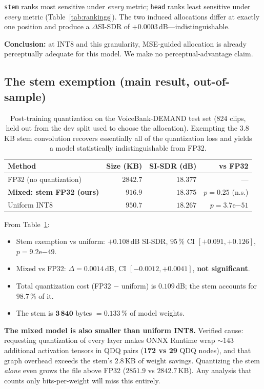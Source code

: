 \documentclass[conference]{IEEEtran}
\begin{document}
\texttt{stem} ranks most sensitive under \emph{every} metric; \texttt{head} ranks least sensitive
under \emph{every} metric (Table~\ref{tab:rankings}). The two induced allocations differ at exactly
one position and produce a $\Delta$SI-SDR of $+0.0003$\,dB---indistinguishable.

\textbf{Conclusion:} at INT8 and this granularity, MSE-guided allocation is already perceptually
adequate for this model. We make no perceptual-advantage claim.

\subsection{The stem exemption (main result, out-of-sample)}
\label{sec:stem}

\begin{table}[t]
\centering
\caption{Post-training quantization on the VoiceBank-DEMAND test set (824 clips, held out from the
dev split used to choose the allocation). Exempting the 3.8\,KB stem convolution recovers
essentially all of the quantization loss and yields a model statistically indistinguishable from
FP32.}
\label{tab:main}
\begin{tabular}{lrrr}
\toprule
Method & Size (KB) & SI-SDR (dB) & vs FP32 \\
\midrule
FP32 (no quantization) & $2842.7$ & $18.377$ & --- \\
\textbf{Mixed: stem FP32 (ours)} & $\mathbf{916.9}$ & $\mathbf{18.375}$ & $p = 0.25$ (n.s.) \\
Uniform INT8 & $950.7$ & $18.267$ & $p = 3.7\mathrm{e}{-51}$ \\
\bottomrule
\end{tabular}
\end{table}

From Table~\ref{tab:main}:
\begin{itemize}
\item Stem exemption vs uniform: $+0.108$\,dB SI-SDR, $95\,\%$ CI $[+0.091, +0.126]$,
$p = 9.2\mathrm{e}{-49}$.
\item Mixed vs FP32: $\Delta = 0.0014$\,dB, CI $[-0.0012, +0.0041]$, \textbf{not significant}.
\item Total quantization cost (FP32 $-$ uniform) is $0.109$\,dB; the stem accounts for
$\mathbf{98.7\,\%}$ of it.
\item The stem is $\mathbf{3\,840}$ bytes $= 0.133\,\%$ of model weights.
\end{itemize}

\textbf{The mixed model is also smaller than uniform INT8.} Verified cause: requesting quantization
of every layer makes ONNX Runtime wrap ${\sim}143$ additional activation tensors in QDQ pairs
(\textbf{172 vs 29} QDQ nodes), and that graph overhead exceeds the stem's $2.8$\,KB of weight
savings. Quantizing the stem \emph{alone} even grows the file above FP32 ($2851.9$ vs
$2842.7$\,KB). Any analysis that counts only bits-per-weight will miss this entirely.
\end{document}
